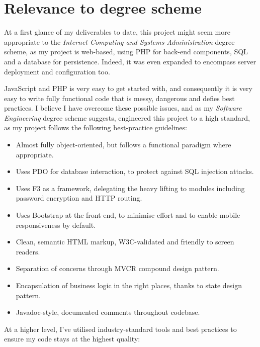 \section{Relevance to degree scheme}

At a first glance of my deliverables to date, this project might seem more appropriate to the \emph{Internet Computing and Systems Administration} degree scheme, as my project is web-based, using PHP for back-end components, SQL and a database for persistence. Indeed, it was even expanded to encompass server deployment and configuration too.

JavaScript and PHP is very easy to get started with, and consequently it is very easy to write fully functional code that is messy, dangerous and defies best practices. I believe I have overcome these possible issues, and as my \emph{Software Engineering} degree scheme suggests, engineered this project to a high standard, as my project follows the following best-practice guidelines:

\begin{itemize}
\item Almost fully object-oriented, but follows a functional paradigm where appropriate.
\item Uses PDO for database interaction, to protect against SQL injection attacks.
\item Uses F3 as a framework, delegating the heavy lifting to modules including password encryption and HTTP routing.
\item Uses Bootstrap at the front-end, to minimise effort and to enable mobile responsiveness by default.
\item Clean, semantic HTML markup, W3C-validated and friendly to screen readers.
\item Separation of concerns through MVCR compound design pattern.
\item Encapsulation of business logic in the right places, thanks to state design pattern.
\item Javadoc-style, documented comments throughout codebase.
\end{itemize}

At a higher level, I've utilised industry-standard tools and best practices to ensure my code stays at the highest quality:

